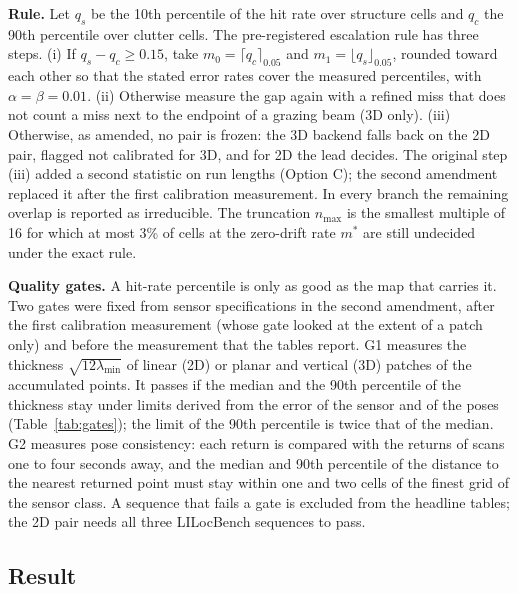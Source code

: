 \noindent\textbf{Rule.} Let $q_s$ be the 10th percentile of the hit rate over structure cells and $q_c$ the 90th percentile over clutter cells. The pre-registered escalation rule has three steps. (i) If $q_s-q_c\ge0.15$, take $m_0=\lceil q_c\rceil_{0.05}$ and $m_1=\lfloor q_s\rfloor_{0.05}$, rounded toward each other so that the stated error rates cover the measured percentiles, with $\alpha=\beta=0.01$. (ii) Otherwise measure the gap again with a refined miss that does not count a miss next to the endpoint of a grazing beam (3D only). (iii) Otherwise, as amended, no pair is frozen: the 3D backend falls back on the 2D pair, flagged not calibrated for 3D, and for 2D the lead decides. The original step (iii) added a second statistic on run lengths (Option C); the second amendment replaced it after the first calibration measurement. In every branch the remaining overlap is reported as irreducible. The truncation $n_{\max}$ is the smallest multiple of 16 for which at most 3\% of cells at the zero-drift rate $m^\ast$ are still undecided under the exact rule.

\noindent\textbf{Quality gates.} A hit-rate percentile is only as good as the map that carries it. Two gates were fixed from sensor specifications in the second amendment, after the first calibration measurement (whose gate looked at the extent of a patch only) and before the measurement that the tables report. G1 measures the thickness $\sqrt{12\lambda_{\min}}$ of linear (2D) or planar and vertical (3D) patches of the accumulated points. It passes if the median and the 90th percentile of the thickness stay under limits derived from the error of the sensor and of the poses (Table~\ref{tab:gates}); the limit of the 90th percentile is twice that of the median. G2 measures pose consistency: each return is compared with the returns of scans one to four seconds away, and the median and 90th percentile of the distance to the nearest returned point must stay within one and two cells of the finest grid of the sensor class. A sequence that fails a gate is excluded from the headline tables; the 2D pair needs all three LILocBench sequences to pass.

\subsection{Result}\label{subsec:calibresult}



